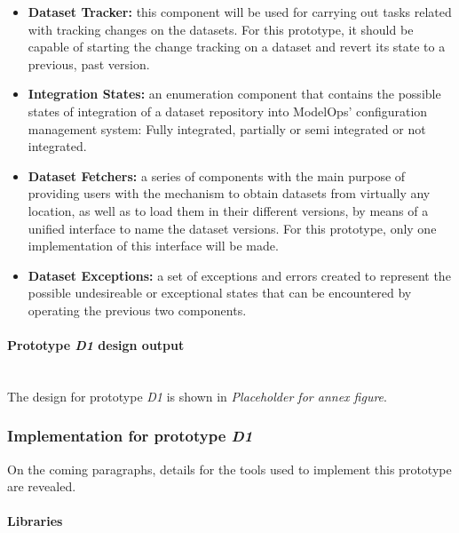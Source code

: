 \begin{itemize}
    \item \textbf{Dataset Tracker: }this component will be used for carrying out tasks related with tracking changes on the datasets. For this prototype, it should be 
    capable of starting the change tracking on a dataset and revert its state to a previous, past version.
    
    \item \textbf{Integration States: }an enumeration component that contains the possible states of integration of a dataset repository into ModelOps' configuration management 
    system: Fully integrated, partially or semi integrated or not integrated.
    
    \item \textbf{Dataset Fetchers: }a series of components with the main purpose of providing users with the mechanism to obtain datasets from virtually any location, as well as to 
    load them in their different versions, by means of a unified interface to name the dataset versions. For this prototype, only one implementation of this interface will be made.
    
    \item \textbf{Dataset Exceptions: }a set of exceptions and errors created to represent the possible undesireable or exceptional states that can be encountered by operating 
    the previous two components.

\end{itemize}



\paragraph{Prototype \emph{D1} design output}\mbox{}\\

The design for prototype \emph{D1} is shown in \emph{Placeholder for annex figure}.

\subsubsection{Implementation for prototype \emph{D1}}

On the coming paragraphs, details for the tools used to implement this prototype are revealed.

\paragraph{Libraries} \mbox{}\\

